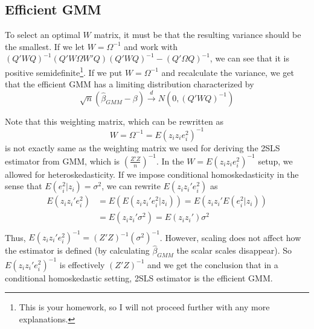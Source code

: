 \documentclass[12pt]{article}
\theoremstyle{definition}
\theoremstyle{property}
\theoremstyle{assumption}
\theoremstyle{example}
\theoremstyle{comment}
\begin{document}
\subsection{Efficient GMM}
To select an optimal $W$ matrix, it must be that the resulting variance should be the smallest. If we let $W=\Omega^{-1}$ and work with $(Q'WQ)^{-1}(Q'W\Omega W'Q)(Q'WQ)^{-1}-(Q'\Omega Q)^{-1}$, we can see that it is positive semidefinite\footnote{This is your homework, so I will not proceed further with any more explanations.}.
If we put $W=\Omega^{-1}$ and  recalculate the variance, we get that the efficient GMM has a limiting distribution characterized by
\[
\sqrt{n}(\hat{\beta}_{GMM}-\beta)\xrightarrow{d}N(0,(Q'WQ)^{-1})
\]\par
Note that this weighting matrix, which can be rewritten as
\[
W=\Omega^{-1}=E(z_iz_ie_i^2)^{-1}
\]
is not exactly same as the weighting matrix we used for deriving the 2SLS estimator from GMM, which is $\left(\frac{Z'Z}{n}\right)^{-1}$. In the $W=E(z_iz_ie_i^2)^{-1}$ setup, we allowed for heteroskedasticity. If we impose conditional homoskedasticity in the sense that $E(e_i^2|z_i)=\sigma^2$, we can rewrite $E(z_iz_i'e_i^2)$ as
\[
\begin{aligned}
E(z_iz_i'e_i^2)&=E(E(z_iz_i'e_i^2|z_i))=E(z_iz_i'E(e_i^2|z_i))\\
&=E(z_iz_i'\sigma^2)=E(z_iz_i')\sigma^2\\
\end{aligned}
\]
Thus, $E(z_iz_i'e_i^2)^{-1}=(Z'Z)^{-1}(\sigma^2)^{-1}$. However, scaling does not affect how the estimator is defined (by calculating $\hat{\beta}_{GMM}$ the scalar scales disappear). So $E(z_iz_i'e_i^2)^{-1}$ is effectively $(Z'Z)^{-1}$ and we get the conclusion that in a conditional homoskedastic setting, 2SLS estimator is the efficient GMM. 
\end{document}
